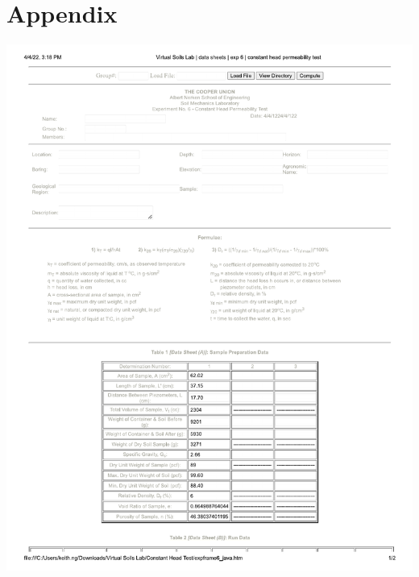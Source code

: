 \documentclass{article}
\begin{document}
\section{Appendix}
\begin{center}
\includegraphics*[scale=0.7]{constant_head_datasheet.pdf}
\newpage

\end{center}
\end{document}

